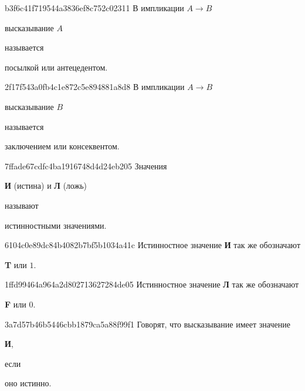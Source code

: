 \begin{note}{b3f6c41f719544a3836ef8c752c02311}
    В импликации \({ A \to B }\) \begin{icloze}{2}высказывание \({ A }\)\end{icloze} называется \begin{icloze}{1}посылкой или антецедентом.\end{icloze}
\end{note}

\begin{note}{2f17f543a0fb4c1e872c5e894881a8d8}
    В импликации \({ A \to B }\) \begin{icloze}{2}высказывание \({ B }\)\end{icloze} называется \begin{icloze}{1}заключением или консеквентом.\end{icloze}
\end{note}

\begin{note}{7ffade67cdfc4ba1916748d4d24eb205}
    Значения \begin{icloze}{2}\textbf{И} (истина) и \textbf{Л} (ложь)\end{icloze} называют \begin{icloze}{1}истинностными значениями.\end{icloze}
\end{note}

\begin{note}{6104c0e89dc84b4082b7bf5b1034a41c}
    Истинностное значение \textbf{И} так же обозначают \begin{icloze}{1}\textbf{T} или \({ 1 }\).\end{icloze}
\end{note}

\begin{note}{1ffd99464a964a2d802713627284de05}
    Истинностное значение \textbf{Л} так же обозначают \begin{icloze}{1}\textbf{F} или \({ 0 }\).\end{icloze}
\end{note}

\begin{note}{3a7d57b46b5446cbb1879ca5a88f99f1}
    Говорят, что высказывание имеет значение \begin{icloze}{2}\textbf{И},\end{icloze} если \begin{icloze}{1}оно истинно.\end{icloze}
\end{note}

